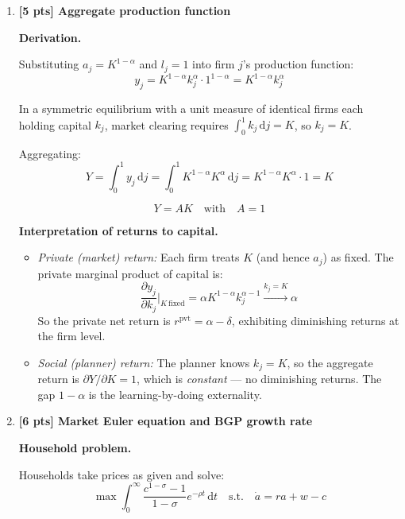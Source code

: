 \documentclass[a4paper,11pt]{article}
\newcommand{\dd}{\mathrm{d}}
\begin{document}
\bigskip
\begin{enumerate}[label=\textbf{(\arabic*)},leftmargin=*]

\item \textbf{[5 pts] Aggregate production function}

\begin{answerbox}
\textbf{Derivation.}

Substituting $a_j = K^{1-\alpha}$ and $l_j = 1$ into firm $j$'s production function:
\[
  y_j = K^{1-\alpha} k_j^{\alpha} \cdot 1^{1-\alpha} = K^{1-\alpha} k_j^{\alpha}
\]

In a symmetric equilibrium with a unit measure of identical firms each holding capital $k_j$, market clearing requires $\int_0^1 k_j\,\dd j = K$, so $k_j = K$.

Aggregating:
\[
  Y = \int_0^1 y_j\,\dd j = \int_0^1 K^{1-\alpha} K^{\alpha}\,\dd j = K^{1-\alpha} K^{\alpha} \cdot 1 = K
\]

\[
  \boxed{Y = AK \quad\text{with}\quad A = 1}
\]

\textbf{Interpretation of returns to capital.}
\begin{itemize}
  \item \emph{Private (market) return:} Each firm treats $K$ (and hence $a_j$) as fixed. The private marginal product of capital is:
  \[
    \frac{\partial y_j}{\partial k_j}\bigg|_{K \,\text{fixed}} = \alpha K^{1-\alpha} k_j^{\alpha-1} \xrightarrow{k_j = K} \alpha
  \]
  So the private net return is $r^{\mathrm{pvt}} = \alpha - \delta$, exhibiting diminishing returns at the firm level.
  \item \emph{Social (planner) return:} The planner knows $k_j = K$, so the aggregate return is $\partial Y/\partial K = 1$, which is \emph{constant} --- no diminishing returns. The gap $1 - \alpha$ is the learning-by-doing externality.
\end{itemize}
\end{answerbox}

\bigskip

\item \textbf{[6 pts] Market Euler equation and BGP growth rate}

\begin{answerbox}
\textbf{Household problem.}

Households take prices as given and solve:
\[
  \max \int_0^{\infty} \frac{c^{1-\sigma}-1}{1-\sigma} e^{-\rho t}\,\dd t \quad\text{s.t.}\quad \dot{a} = r a + w - c
\]


\end{answerbox}
\end{enumerate}
\end{document}
